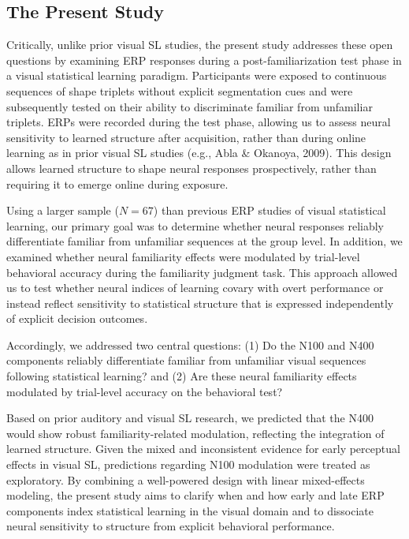 \subsection*{The Present Study}

Critically, unlike prior visual SL studies, the present study addresses these open questions by examining ERP responses during a post-familiarization test phase in a visual statistical learning paradigm. Participants were exposed to continuous sequences of shape triplets without explicit segmentation cues and were subsequently tested on their ability to discriminate familiar from unfamiliar triplets. ERPs were recorded during the test phase, allowing us to assess neural sensitivity to learned structure after acquisition, rather than during online learning as in prior visual SL studies (e.g., Abla \& Okanoya, 2009). This design allows learned structure to shape neural responses prospectively, rather than requiring it to emerge online during exposure.

Using a larger sample ($N = 67$) than previous ERP studies of visual statistical learning, our primary goal was to determine whether neural responses reliably differentiate familiar from unfamiliar sequences at the group level. In addition, we examined whether neural familiarity effects were modulated by trial-level behavioral accuracy during the familiarity judgment task. This approach allowed us to test whether neural indices of learning covary with overt performance or instead reflect sensitivity to statistical structure that is expressed independently of explicit decision outcomes.

Accordingly, we addressed two central questions: (1) Do the N100 and N400 components reliably differentiate familiar from unfamiliar visual sequences following statistical learning? and (2) Are these neural familiarity effects modulated by trial-level accuracy on the behavioral test?

Based on prior auditory and visual SL research, we predicted that the N400 would show robust familiarity-related modulation, reflecting the integration of learned structure. Given the mixed and inconsistent evidence for early perceptual effects in visual SL, predictions regarding N100 modulation were treated as exploratory. By combining a well-powered design with linear mixed-effects modeling, the present study aims to clarify when and how early and late ERP components index statistical learning in the visual domain and to dissociate neural sensitivity to structure from explicit behavioral performance.


